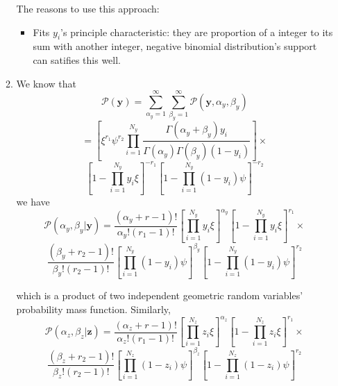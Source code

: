 \documentclass[twoside,11pt]{amsart}
\begin{document}
\begin{enumerate}
\begin{enumerate}
    The reasons to use this approach:    
    \begin{itemize}
      \item Fits $y_i$'s principle characteristic: they are proportion
        of a integer to its sum with another integer, negative binomial
        distribution's support can satifies this well.
    \end{itemize}
      

  \item
    We know that
    \[
    \mathscr P(\bm y) = \sum_{\alpha_y=1}^\infty\sum_{\beta_y=1}^\infty\mathscr P(\bm y, \alpha_y, \beta_y)
    \]
    \[=
    \left[\xi^{r_1}\psi^{r_2}\prod_{i=1}^{N_y}\frac{\Gamma(\alpha_y+\beta_y)y_i}{\Gamma(\alpha_y)\Gamma(\beta_y)(1-y_i)}\right]
    \times \]
    \[
    \left[1-\prod_{i=1}^{N_y}y_i\xi\right]^{-r_1}\left[1-\prod_{i=1}^{N_y}(1-y_i)\psi\right]^{-r_2}
    \]
    we have
    \[
    \mathscr P(\alpha_y, \beta_y|\bm y) =
    \frac{(\alpha_y+r-1)!}{\alpha_y!(r_1-1)!}
    \left[\prod_{i=1}^{N_y}y_i\xi\right]^{\alpha_y}\left[1-\prod_{i=1}^{N_y}y_i\xi\right]^{r_1}\times
    \]
    \[
    \frac{(\beta_y+r_2-1)!}{\beta_y!(r_2-1)!}
    \left[\prod_{i=1}^{N_y}(1-y_i)\psi\right]^{\beta_y}\left[1-\prod_{i=1}^{N_y}(1-y_i)\psi\right]^{r_2}
    \]
    
    which is a product of two independent geometric random variables'
    probability mass function. Similarly, 
    \[
    \mathscr P(\alpha_z, \beta_z|\bm z) =
    \frac{(\alpha_z+r-1)!}{\alpha_z!(r_1-1)!}
    \left[\prod_{i=1}^{N_z}z_i\xi\right]^{\alpha_z}\left[1-\prod_{i=1}^{N_z}z_i\xi\right]^{r_1}\times
    \]
    \[
        \frac{(\beta_z+r_2-1)!}{\beta_z!(r_2-1)!}
    \left[\prod_{i=1}^{N_z}(1-z_i)\psi\right]^{\beta_z}\left[1-\prod_{i=1}^{N_z}(1-z_i)\psi\right]^{r_2}
    \]    


\end{enumerate}
\end{enumerate}
\end{document}
